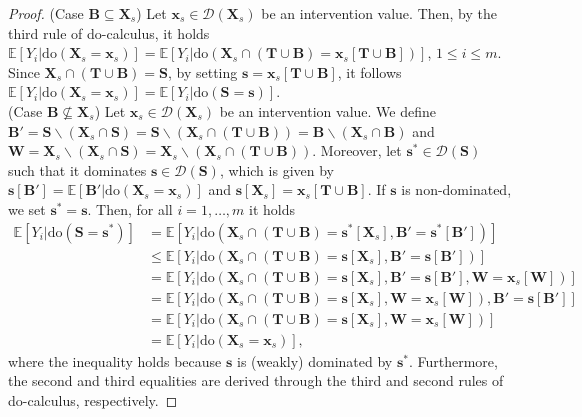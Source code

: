 \begin{proof}
    (Case $\mathbf{B} \subseteq \mathbf{X}_s$) Let $\mathbf{x}_s \in \mathcal{D}(\mathbf{X}_s)$ be an intervention value. Then, by the third rule of do-calculus, it holds $\mathbb{E}[Y_i | \text{do}(\mathbf{X}_s=\mathbf{x}_s)]=\mathbb{E}[Y_i | \text{do}(\mathbf{X}_s \cap (\mathbf{T} \cup \mathbf{B}) =\mathbf{x}_s[\mathbf{T} \cup \mathbf{B}])]$, $1 \leq i \leq m$. Since $\mathbf{X}_s \cap (\mathbf{T} \cup \mathbf{B}) = \mathbf{S}$, by setting $\mathbf{s} = \mathbf{x}_s[\mathbf{T} \cup \mathbf{B}]$, it follows $\mathbb{E}[Y_i | \text{do}(\mathbf{X}_s=\mathbf{x}_s)] = \mathbb{E}[Y_i | \text{do}(\mathbf{S}=\mathbf{s})]$.
    \vspace{0.2cm}\\
    (Case $\mathbf{B} \not\subseteq \mathbf{X}_s$) Let $\mathbf{x}_s \in \mathcal{D}(\mathbf{X}_s)$ be an intervention value. We define $\mathbf{B}' = \mathbf{S} \backslash (\mathbf{X}_s \cap \mathbf{S}) = \mathbf{S} \backslash (\mathbf{X}_s \cap (\mathbf{T} \cup \mathbf{B})) = \mathbf{B} \backslash (\mathbf{X}_s \cap \mathbf{B})$ and $\mathbf{W} = \mathbf{X}_s \backslash (\mathbf{X}_s \cap \mathbf{S}) = \mathbf{X}_s \backslash (\mathbf{X}_s \cap (\mathbf{T} \cup \mathbf{B}))$. Moreover, let $\mathbf{s}^* \in \mathcal{D}(\mathbf{S})$ such that it dominates $\mathbf{s} \in \mathcal{D}(\mathbf{S})$, which is given by $\mathbf{s}[\mathbf{B}'] = \mathbb{E}[\mathbf{B}' | \text{do}(\mathbf{X}_s=\mathbf{x}_s)]$ and $\mathbf{s}[\mathbf{X}_s] = \mathbf{x}_s[\mathbf{T} \cup \mathbf{B}]$. If $\mathbf{s}$ is non-dominated, we set $\mathbf{s}^* = \mathbf{s}$. Then, for all $i=1,\dots,m$ it holds
    \begin{align}
        \mathbb{E}[Y_i | \text{do}(\mathbf{S}=\mathbf{s}^*)] &= \mathbb{E}[Y_i | \text{do}(\mathbf{X}_s \cap (\mathbf{T} \cup \mathbf{B}) =\mathbf{s}^*[\mathbf{X}_s], \mathbf{B}'=\mathbf{s}^*[\mathbf{B}'])]\\
        & \leq \mathbb{E}[Y_i | \text{do}(\mathbf{X}_s \cap (\mathbf{T} \cup \mathbf{B}) =\mathbf{s}[\mathbf{X}_s], \mathbf{B}'=\mathbf{s}[\mathbf{B}'])] \\
        &= \mathbb{E}[Y_i | \text{do}(\mathbf{X}_s \cap (\mathbf{T} \cup \mathbf{B}) =\mathbf{s}[\mathbf{X}_s], \mathbf{B}'=\mathbf{s}[\mathbf{B}'], \mathbf{W}=\mathbf{x}_s[\mathbf{W}])]\\
        &=\mathbb{E}[Y_i | \text{do}(\mathbf{X}_s \cap (\mathbf{T} \cup \mathbf{B}) =\mathbf{s}[\mathbf{X}_s], \mathbf{W}=\mathbf{x}_s[\mathbf{W}]), \mathbf{B}'=\mathbf{s}[\mathbf{B}']]\\
        &= \mathbb{E}[Y_i | \text{do}(\mathbf{X}_s \cap (\mathbf{T} \cup \mathbf{B}) =\mathbf{s}[\mathbf{X}_s], \mathbf{W}=\mathbf{x}_s[\mathbf{W}])]\\
        &= \mathbb{E}[Y_i | \text{do}(\mathbf{X}_s=\mathbf{x}_s)],
    \end{align}
    where the inequality holds because $\mathbf{s}$ is (weakly) dominated by $\mathbf{s}^*$. Furthermore, the second and third equalities are derived through the third and second rules of do-calculus, respectively.
\end{proof}

